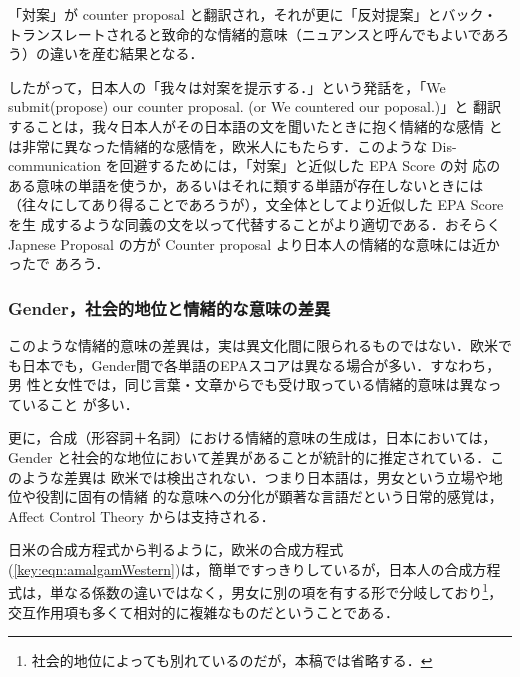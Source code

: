 \documentclass[japanese]{jnlp_1.3d}
\begin{document}
「対案」が counter proposal と翻訳され，それが更に「反対提案」とバック・
トランスレートされると致命的な情緒的意味（ニュアンスと呼んでもよいであろ
う）の違いを産む結果となる．



したがって，日本人の「我々は対案を提示する．」という発話を，「We
submit(propose) our counter proposal. (or We countered our poposal.)」と
翻訳することは，我々日本人がその日本語の文を聞いたときに抱く情緒的な感情
とは非常に異なった情緒的な感情を，欧米人にもたらす．このような
Dis-communication を回避するためには，「対案」と近似した EPA Score の対
応のある意味の単語を使うか，あるいはそれに類する単語が存在しないときには
（往々にしてあり得ることであろうが），文全体としてより近似した EPA Score を生
成するような同義の文を以って代替することがより適切である．おそらく Japnese
Proposal の方が Counter proposal より日本人の情緒的な意味には近かったで
あろう． 







\subsubsection{Gender，社会的地位と情緒的な意味の差異}
このような情緒的意味の差異は，実は異文化間に限られるものではない．欧米で
も日本でも，Gender間で各単語のEPAスコアは異なる場合が多い．すなわち，男
性と女性では，同じ言葉・文章からでも受け取っている情緒的意味は異なっていること
が多い．


更に，合成（形容詞＋名詞）における情緒的意味の生成は，日本においては，Gender と社会的な地位において差異があることが統計的に推定されている．このような差異は
欧米では検出されない．つまり日本語は，男女という立場や地位や役割に固有の情緒
的な意味への分化が顕著な言語だという日常的感覚は，Affect Control Theory
からは支持される．

日米の合成方程式から判るように，欧米の合成方程式(\ref{key:eqn:amalgamWestern})は，簡単ですっきりしているが，日本人の合成方程式は，単なる係数の違いではなく，男女に別の項を有する形で分岐しており\footnote{社会的地位によっても別れているのだが，本稿では省略する．}，交互作用項も多くて相対的に複雑なものだということである．
\end{document}
